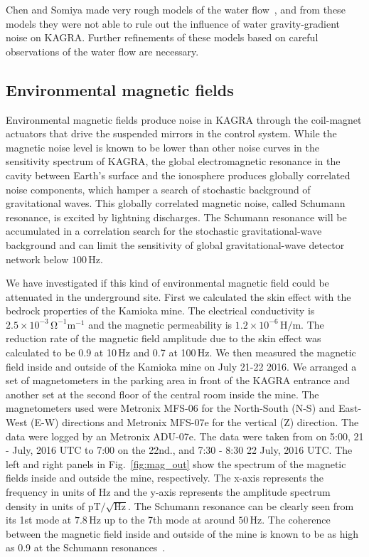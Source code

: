 \documentclass[prd ,twocolumn ,secnumarabic,dvips
,amssymb, amsmath,nobibnotes, aps, prd,superscriptaddress]{revtex4-1}
\begin{document}
{Chen and Somiya made very rough models of the water flow~{\cite{YanbeiWaterGGN,SomiyaWaterGGN}}, and from these models they were not able to rule out the influence of water gravity-gradient noise on KAGRA. Further refinements of these models based on careful observations of the water flow are necessary. 

\subsection{Environmental magnetic fields}\label{sec:app2}
%
Environmental magnetic fields produce noise in KAGRA through the coil-magnet actuators that drive the suspended mirrors in the control system. While the magnetic noise level is known to be lower than other noise curves in the sensitivity spectrum of KAGRA, the global electromagnetic resonance in the cavity between Earth's surface and the ionosphere produces globally correlated noise components, which hamper a search of stochastic background of gravitational waves. This globally correlated magnetic noise, called Schumann resonance, is excited by lightning discharges. The Schumann resonance will be accumulated in a correlation search for the stochastic gravitational-wave background and can limit the sensitivity of global gravitational-wave detector network below $100\,\mathrm{Hz}$.

We have investigated if this kind of environmental magnetic field could be attenuated in the underground site. First we calculated the skin effect with the bedrock properties of the Kamioka mine. The electrical conductivity is $2.5\times10^{-3}\,\mathrm{\Omega}^{-1}\mathrm{m}^{-1}$ and the magnetic permeability is $1.2\times10^{-6}\,\mathrm{H/m}$. The reduction rate of the magnetic field amplitude due to the skin effect was calculated to be 0.9 at 10\,Hz and 0.7 at 100\,Hz.
We then measured the magnetic field inside and outside of the Kamioka mine on July 21-22 2016.
We arranged a set of magnetometers in the parking area in front of the KAGRA entrance and another set at the second floor of the central room inside the mine.
The magnetometers used were Metronix MFS\mbox{-}06 for the North\mbox{-}South (N\mbox{-}S) and East\mbox{-}West (E\mbox{-}W) directions and Metronix MFS\mbox{-}07e for the vertical (Z) direction.
The data were logged by an Metronix ADU\mbox{-}07e. The data were taken from on 5:00, 21 \mbox{-} July, 2016 UTC to 7:00 on the 22nd., and 7:30 \mbox{-} 8:30 22 July, 2016 UTC.
The left and right panels in Fig.~\ref{fig:mag_out} show the spectrum of the magnetic fields inside and outside the mine, respectively. The x\mbox{-}axis represents the frequency in units of Hz and the y\mbox{-}axis represents the amplitude spectrum density in units of $\mathrm{pT}/\sqrt{\mathrm{Hz}}$. The Schumann resonance can be clearly seen from its 1st mode at $7.8\,\mathrm{Hz}$ up to the 7th mode at around $50\,\mathrm{Hz}$. The coherence between the magnetic field inside and outside of the mine is known to be as high as 0.9 at the Schumann resonances~\cite{atsuta}.

}
\end{document}

